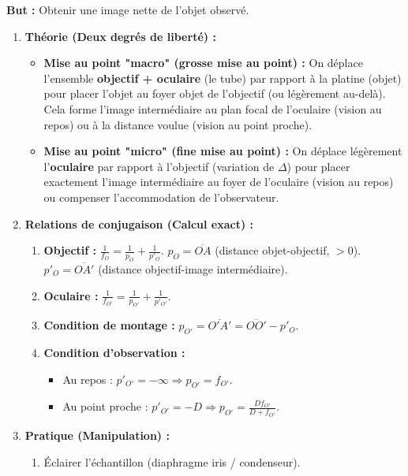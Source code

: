 \documentclass[11pt]{article}
\begin{document}
\begin{methode}
\textbf{But :} Obtenir une image nette de l'objet observé.
\begin{enumerate}
    \item \textbf{Théorie (Deux degrés de liberté) :}
    \begin{itemize}
        \item \textbf{Mise au point "macro" (grosse mise au point) :} On déplace l'ensemble \textbf{objectif + oculaire} (le tube) par rapport à la platine (objet) pour placer l'objet au foyer objet de l'objectif (ou légèrement au-delà). Cela forme l'image intermédiaire au plan focal de l'oculaire (vision au repos) ou à la distance voulue (vision au point proche).
        \item \textbf{Mise au point "micro" (fine mise au point) :} On déplace légèrement l'\textbf{oculaire} par rapport à l'objectif (variation de $\Delta$) pour placer exactement l'image intermédiaire au foyer de l'oculaire (vision au repos) ou compenser l'accommodation de l'observateur.
    \end{itemize}
    \item \textbf{Relations de conjugaison (Calcul exact) :}
    \begin{enumerate}
        \item \textbf{Objectif :} $\frac{1}{f_O} = \frac{1}{p_O} + \frac{1}{p'_O}$. $p_O = \overline{OA}$ (distance objet-objectif, $>0$). $p'_O = \overline{OA'}$ (distance objectif-image intermédiaire).
        \item \textbf{Oculaire :} $\frac{1}{f_{O'}} = \frac{1}{p_{O'}} + \frac{1}{p'_{O'}}$.
        \item \textbf{Condition de montage :} $p_{O'} = \overline{O'A'} = \overline{OO'} - p'_O$.
        \item \textbf{Condition d'observation :}
        \begin{itemize}
            \item Au repos : $p'_{O'} = -\infty \Rightarrow p_{O'} = f_{O'}$.
            \item Au point proche : $p'_{O'} = -D \Rightarrow p_{O'} = \frac{D f_{O'}}{D+f_{O'}}$.
        \end{itemize}
    \end{enumerate}
    \item \textbf{Pratique (Manipulation) :}
    \begin{enumerate}
        \item Éclairer l'échantillon (diaphragme iris / condenseur).

\end{enumerate}
\end{enumerate}
\end{methode}
\end{document}
